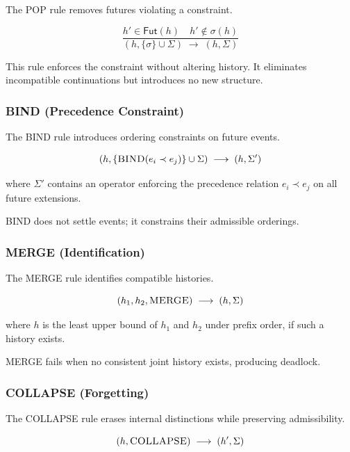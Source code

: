 \documentclass[11pt]{article}
\begin{document}
The POP rule removes futures violating a constraint.

\[
\frac{
h' \in \mathsf{Fut}(h)
\quad
h' \notin \sigma(h)
}{
(h, \{\sigma\} \cup \Sigma)
\;\longrightarrow\;
(h, \Sigma)
}
\]

This rule enforces the constraint without altering history. It eliminates
incompatible continuations but introduces no new structure.

\subsubsection{BIND (Precedence Constraint)}

The BIND rule introduces ordering constraints on future events.

\[
(h, \{\textsc{BIND}(e_i \prec e_j)\} \cup \Sigma)
\;\longrightarrow\;
(h, \Sigma')
\]

where $\Sigma'$ contains an operator enforcing the precedence relation
$e_i \prec e_j$ on all future extensions.

BIND does not settle events; it constrains their admissible orderings.

\subsubsection{MERGE (Identification)}

The MERGE rule identifies compatible histories.

\[
(h_1, h_2, \textsc{MERGE})
\;\longrightarrow\;
(h, \Sigma)
\]

where $h$ is the least upper bound of $h_1$ and $h_2$ under prefix order, if such a
history exists.

MERGE fails when no consistent joint history exists, producing deadlock.

\subsubsection{COLLAPSE (Forgetting)}

The COLLAPSE rule erases internal distinctions while preserving admissibility.

\[
(h, \textsc{COLLAPSE})
\;\longrightarrow\;
(h', \Sigma)
\]
\end{document}
